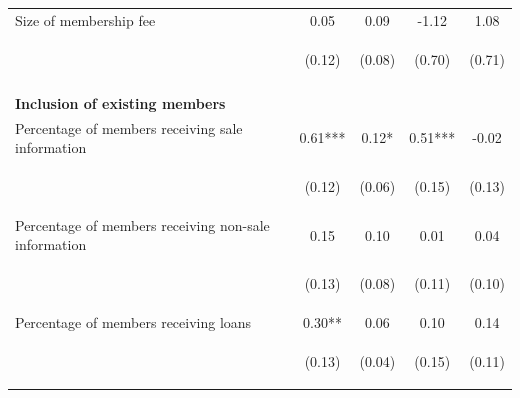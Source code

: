\documentclass[11pt]{article}
\begin{document}
\begin{table}[H]
{\begin{tabularx}{1.3\linewidth}{lcccc}
\noalign{\smallskip}Size of membership fee & 0.05 & 0.09 & -1.12 & 1.08\\
 & \begin{footnotesize}(0.12)\end{footnotesize} & \begin{footnotesize}(0.08)\end{footnotesize} & \begin{footnotesize}(0.70)\end{footnotesize} & \begin{footnotesize}(0.71)\end{footnotesize}\\ \\
 
 \textbf{Inclusion of existing members} & & & & \\
\noalign{\smallskip}Percentage of members receiving sale information & 0.61*** & 0.12* & 0.51*** & -0.02\\
 & \begin{footnotesize}(0.12)\end{footnotesize} & \begin{footnotesize}(0.06)\end{footnotesize} & \begin{footnotesize}(0.15)\end{footnotesize} & \begin{footnotesize}(0.13)\end{footnotesize}\\
\noalign{\smallskip}Percentage of members receiving non-sale information & 0.15 & 0.10 & 0.01 & 0.04\\
 & \begin{footnotesize}(0.13)\end{footnotesize} & \begin{footnotesize}(0.08)\end{footnotesize} & \begin{footnotesize}(0.11)\end{footnotesize} & \begin{footnotesize}(0.10)\end{footnotesize}\\
\noalign{\smallskip}Percentage of members receiving loans & 0.30** & 0.06 & 0.10 & 0.14\\
 & \begin{footnotesize}(0.13)\end{footnotesize} & \begin{footnotesize}(0.04)\end{footnotesize} & \begin{footnotesize}(0.15)\end{footnotesize} & \begin{footnotesize}(0.11)\end{footnotesize}\\

\end{tabularx}}
\end{table}
\end{document}
